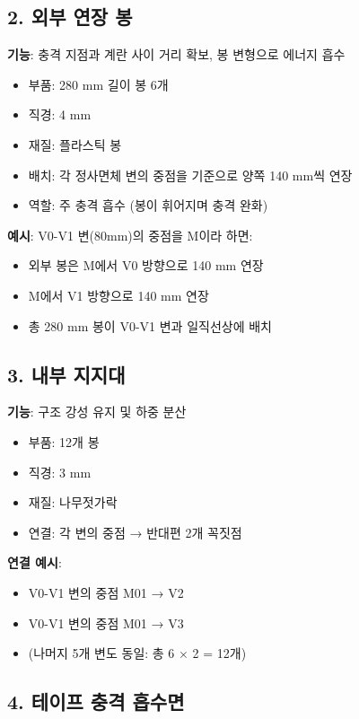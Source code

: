 \documentclass[a4paper,12pt]{article}
\begin{document}
\begin{CJK}{UTF8}{mj}
\subsection{2. 외부 연장 봉}

\textbf{기능}: 충격 지점과 계란 사이 거리 확보, 봉 변형으로 에너지 흡수

\begin{itemize}
    \item 부품: 280 mm 길이 봉 6개
    \item 직경: 4 mm
    \item 재질: 플라스틱 봉
    \item 배치: 각 정사면체 변의 중점을 기준으로 양쪽 140 mm씩 연장
    \item 역할: 주 충격 흡수 (봉이 휘어지며 충격 완화)
\end{itemize}

\textbf{예시}: V0-V1 변(80mm)의 중점을 M이라 하면:
\begin{itemize}
    \item 외부 봉은 M에서 V0 방향으로 140 mm 연장
    \item M에서 V1 방향으로 140 mm 연장
    \item 총 280 mm 봉이 V0-V1 변과 일직선상에 배치
\end{itemize}

\subsection{3. 내부 지지대}

\textbf{기능}: 구조 강성 유지 및 하중 분산

\begin{itemize}
    \item 부품: 12개 봉
    \item 직경: 3 mm
    \item 재질: 나무젓가락
    \item 연결: 각 변의 중점 → 반대편 2개 꼭짓점
\end{itemize}

\textbf{연결 예시}:
\begin{itemize}
    \item V0-V1 변의 중점 M01 → V2
    \item V0-V1 변의 중점 M01 → V3
    \item (나머지 5개 변도 동일: 총 6 $\times$ 2 = 12개)
\end{itemize}

\subsection{4. 테이프 충격 흡수면}


\end{CJK}
\end{document}
